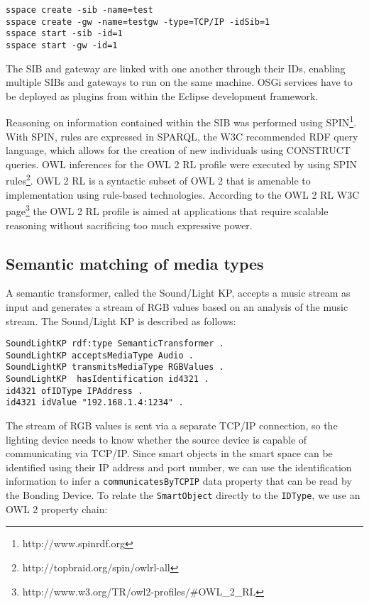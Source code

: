 \begin{verbatim}
sspace create -sib -name=test
sspace create -gw -name=testgw -type=TCP/IP -idSib=1
sspace start -sib -id=1
sspace start -gw -id=1
\end{verbatim}

The \ac{SIB} and gateway are linked with one another through their IDs, enabling multiple \ac{SIB}s and gateways to run on the same machine. \ac{OSGi} services have to be deployed as plugins from within the Eclipse development framework.

Reasoning on information contained within the \ac{SIB} was performed using \ac{SPIN}\footnote{http://www.spinrdf.org}. With SPIN, rules are expressed in \ac{SPARQL}, the W3C recommended \ac{RDF} query language, which allows for the creation of new individuals using CONSTRUCT queries. \ac{OWL} inferences for the \ac{OWL} 2 \ac{RL} profile were executed by using \ac{SPIN} rules\footnote{ http://topbraid.org/spin/owlrl-all}. OWL 2 RL is a syntactic subset of OWL 2 that is amenable to implementation using rule-based technologies. According to the OWL 2 RL W3C page\footnote{http://www.w3.org/TR/owl2-profiles/\#OWL\_2\_RL} the OWL 2 RL profile is aimed at applications that require scalable reasoning without sacrificing too much expressive power. 

\subsection{Semantic matching of media types}
\label{SemanticMatching}

A semantic transformer, called the Sound/Light KP, accepts a music stream as input and generates a stream of RGB values based on an analysis of the music stream. The Sound/Light KP is described as follows:

\begin{verbatim}
SoundLightKP rdf:type SemanticTransformer .
SoundLightKP acceptsMediaType Audio .
SoundLightKP transmitsMediaType RGBValues .
SoundLightKP  hasIdentification id4321 .
id4321 ofIDType IPAddress .
id4321 idValue "192.168.1.4:1234" .
\end{verbatim}

The stream of RGB values is sent via a separate TCP/IP connection, so the lighting device needs to know whether the source device is capable of communicating via TCP/IP. Since smart objects in the smart space can be identified using their IP address and port number, we can use the identification information to infer a \texttt{communicatesByTCPIP} data property that can be read by the Bonding Device. To relate the \texttt{SmartObject} directly to the \texttt{IDType}, we use an \ac{OWL} 2 property chain:

